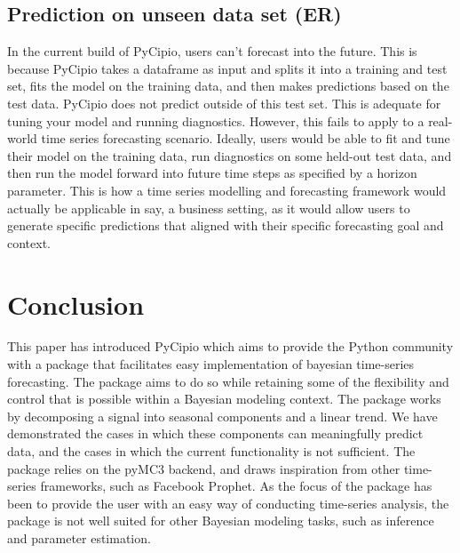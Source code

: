 \documentclass{article}
\begin{document}
\subsection{Prediction on unseen data set (ER)}

\noindent In the current build of PyCipio, users can't forecast into the future. This is because PyCipio takes a dataframe as input and splits it into a training and test set, fits the model on the training data, and then makes predictions based on the test data. PyCipio does not predict outside of this test set. This is adequate for tuning your model and running diagnostics. However, this fails to apply to a real-world time series forecasting scenario. Ideally, users would be able to fit and tune their model on the training data, run diagnostics on some held-out test data, and then run the model forward into future time steps as specified by a horizon parameter. This is how a time series modelling and forecasting framework would actually be applicable in say, a business setting, as it would allow users to generate specific predictions that aligned with their specific forecasting goal and context.

\section{Conclusion}

\noindent This paper has introduced PyCipio which aims to provide the Python community with a package that facilitates easy implementation of bayesian time-series forecasting. The package aims to do so while retaining some of the flexibility and control that is possible within a Bayesian modeling context. The package works by decomposing a signal into seasonal components and a linear trend. We have demonstrated the cases in which these components can meaningfully predict data, and the cases in which the current functionality is not sufficient. The package relies on the pyMC3 backend, and draws inspiration from other time-series frameworks, such as Facebook Prophet. As the focus of the package has been to provide the user with an easy way of conducting time-series analysis, the package is not well suited for other Bayesian modeling tasks, such as inference and parameter estimation. 




\end{document}
